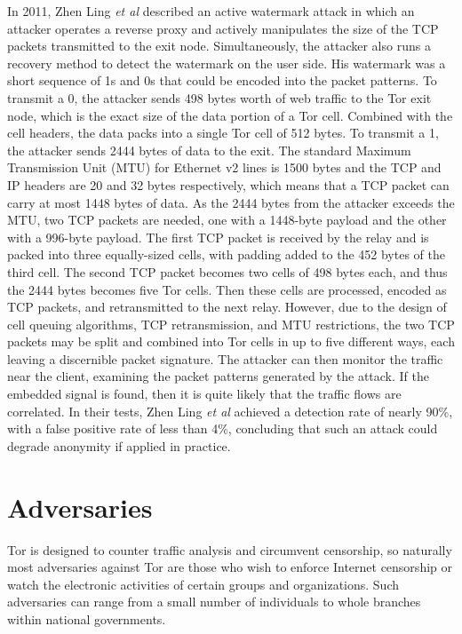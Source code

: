 \documentclass[journal]{IEEEtran}
\begin{document}
In 2011, Zhen Ling \textit{et al} described an active watermark attack in which an attacker operates a reverse proxy and actively manipulates the size of the TCP packets transmitted to the exit node. Simultaneously, the attacker also runs a recovery method to detect the watermark on the user side. His watermark was a short sequence of 1s and 0s that could be encoded into the packet patterns. To transmit a 0, the attacker sends 498 bytes worth of web traffic to the Tor exit node, which is the exact size of the data portion of a Tor cell. Combined with the cell headers, the data packs into a single Tor cell of 512 bytes. To transmit a 1, the attacker sends 2444 bytes of data to the exit. The standard Maximum Transmission Unit (MTU) for Ethernet v2 lines is 1500 bytes and the TCP and IP headers are 20 and 32 bytes respectively, which means that a TCP packet can carry at most 1448 bytes of data. As the 2444 bytes from the attacker exceeds the MTU, two TCP packets are needed, one with a 1448-byte payload and the other with a 996-byte payload. The first TCP packet is received by the relay and is packed into three equally-sized cells, with padding added to the 452 bytes of the third cell. The second TCP packet becomes two cells of 498 bytes each, and thus the 2444 bytes becomes five Tor cells. Then these cells are processed, encoded as TCP packets, and retransmitted to the next relay. However, due to the design of cell queuing algorithms, TCP retransmission, and MTU restrictions, the two TCP packets may be split and combined into Tor cells in up to five different ways, each leaving a discernible packet signature. The attacker can then monitor the traffic near the client, examining the packet patterns generated by the attack. If the embedded signal is found, then it is quite likely that the traffic flows are correlated. In their tests, Zhen Ling \textit{et al} achieved a detection rate of nearly 90\%, with a false positive rate of less than 4\%, concluding that such an attack could degrade anonymity if applied in practice.\cite{Ling2011}

\section{Adversaries}

Tor is designed to counter traffic analysis and circumvent censorship, so naturally most adversaries against Tor are those who wish to enforce Internet censorship or watch the electronic activities of certain groups and organizations. Such adversaries can range from a small number of individuals to whole branches within national governments.
\end{document}
